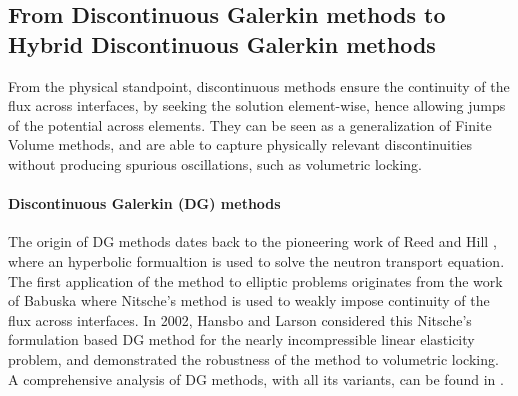 
\subsection{From Discontinuous Galerkin methods to Hybrid Discontinuous Galerkin methods}

From the physical standpoint, discontinuous methods ensure the continuity of the flux
across interfaces, by seeking the solution element-wise, hence allowing
jumps of the potential across elements. They can be seen as a
generalization of Finite Volume methods, and are able to capture
physically relevant discontinuities without producing spurious
oscillations, such as volumetric locking.

\paragraph{Discontinuous Galerkin (DG) methods}

The origin of DG methods dates back to the pioneering work of Reed and Hill
\cite{reed_triangular_1973}, where an hyperbolic formualtion is used to
solve the neutron transport equation. The first application of the
method to elliptic problems originates from the work of Babuska \cite{babuska_finite_1973}
where Nitsche's method \cite{nitsche_uber_1970} is used to weakly impose
continuity of the flux across interfaces.
In 2002, Hansbo and Larson \cite{hansbo_discontinuous_2002-1} considered this
Nitsche's formulation based DG
method for the nearly incompressible linear
elasticity problem, and demonstrated the robustness of the method to volumetric locking.
A comprehensive analysis of DG methods, with all its variants, can be found in \cite{arnold_unified_2002}.

